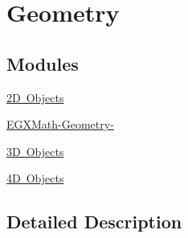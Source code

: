 \hypertarget{group___e_g_x_math-_geometry}{}\section{Geometry}
\label{group___e_g_x_math-_geometry}
\subsection*{Modules}
\begin{DoxyCompactItemize}
\item 
\mbox{\hyperlink{group___e_g_x_math-_geometry-2_d}{2\+D Objects}}
\item 
\mbox{\hyperlink{group___e_g_x_math-_geometry-}{E\+G\+X\+Math-\/\+Geometry-\/}}
\item 
\mbox{\hyperlink{group___e_g_x_math-_geometry-3_d}{3\+D Objects}}
\item 
\mbox{\hyperlink{group___e_g_x_math-_geometry-4_d}{4\+D Objects}}
\end{DoxyCompactItemize}


\subsection{Detailed Description}
